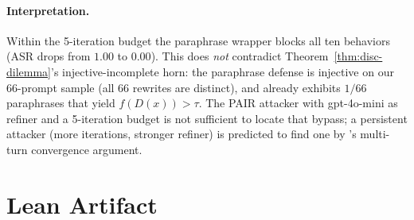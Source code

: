 \documentclass[11pt]{article}
\begin{document}
\paragraph{Interpretation.}
Within the 5-iteration budget the paraphrase wrapper blocks all ten
behaviors (ASR drops from $1.00$ to $0.00$). This does \emph{not}
contradict Theorem~\ref{thm:disc-dilemma}'s injective-incomplete
horn: the paraphrase defense is injective on our 66-prompt sample
(all 66 rewrites are distinct), and 
already exhibits $1/66$ paraphrases that yield $f(D(x)) > \tau$. The
PAIR attacker with gpt-4o-mini as refiner and a 5-iteration budget
is not sufficient to locate that bypass; a persistent attacker (more
iterations, stronger refiner) is predicted to find one by
's multi-turn convergence argument.


\section{Lean Artifact}
\label{app:artifact}
\end{document}
